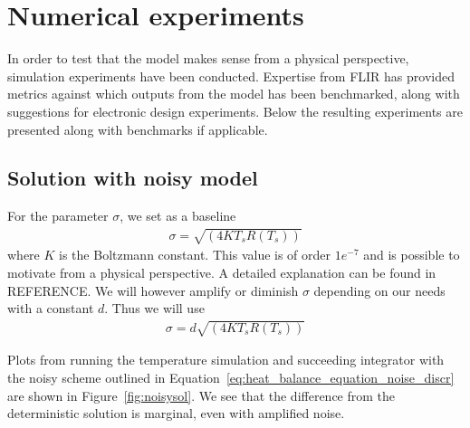 \section{Numerical experiments}

In order to test that the model makes sense from a physical perspective, simulation experiments have been conducted. Expertise from FLIR has provided metrics against which 
outputs from the model has been benchmarked, along with suggestions for electronic design experiments. Below the resulting experiments are presented along with benchmarks if applicable.

\subsection{Solution with noisy model}
For the parameter $\sigma$, we set as a baseline
\begin{align}
\sigma = \sqrt{(4KT_sR(T_s))}
\end{align}
where  $K$ is the Boltzmann constant. This value is of order $1e^{-7}$ and is possible to motivate from a physical perspective. A detailed explanation can be found in REFERENCE. 
We will however amplify or diminish $\sigma$ depending on our needs with a constant $d$. Thus we will use 
\begin{align}
\sigma = d \sqrt{(4KT_sR(T_s))}
\end{align}

Plots from running the temperature simulation and succeeding integrator with the noisy scheme outlined in Equation~\eqref{eq:heat_balance_equation_noise_discr} are shown
in Figure~\ref{fig:noisysol}. We see that the difference from the deterministic solution is marginal, even with amplified noise. 



